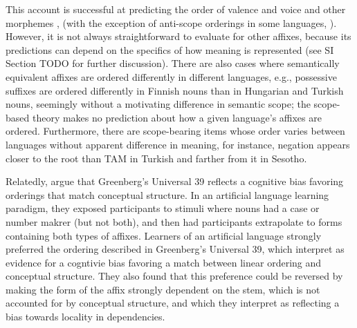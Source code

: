 \documentclass[11pt,letterpaper]{article}
\newcommand{\citep}{\parencite}
\newcommand{\citet}{\Textcite}
\newcommand\mhahn[1]{{\color{red}(#1)}}
\newcommand{\jd}[1]{\textcolor{Pink}{[jd: #1]}}
\begin{document}
This account is successful at predicting the order of valence and voice and other morphemes \citep[e.g.,][]{rice2000morpheme, caballero2010scope,  narrog2010the, korotkova2010deriving}, (with the exception of anti-scope orderings in some languages, \citep{...}).
However, it is not always straightforward to evaluate for other affixes, because its predictions can depend on the specifics of how meaning is represented (see SI Section TODO for further discussion).
There are also cases where semantically equivalent affixes are ordered differently in different languages, e.g., possessive suffixes are ordered differently in Finnish nouns than in Hungarian and Turkish nouns, seemingly without a motivating difference in semantic scope; the scope-based theory makes no prediction about how a given language's affixes are ordered.
Furthermore, there are scope-bearing items whose order varies between languages without apparent difference in meaning, for instance, negation appears closer to the root than TAM in Turkish and farther from it in Sesotho.

Relatedly, \citet{saldana2021cross} argue that Greenberg's Universal 39 reflects a cognitive bias favoring orderings that match conceptual structure.
In an artificial language learning paradigm, they exposed participants to stimuli where nouns had a case or number makrer (but not both), and then had participants extrapolate to forms containing both types of affixes.
Learners of an artificial language strongly preferred the ordering described in Greenberg's Universal 39, which \citet{saldana2021cross} interpret as evidence for a cogntivie bias favoring a match between linear ordering and conceptual structure.
They also found that this preference could be reversed by making the form of the affix strongly dependent on the stem, which is not accounted for by conceptual structure, and which they interpret as reflecting a bias towards locality in dependencies.


\end{document}
